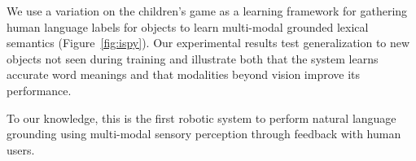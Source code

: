 We use a variation on the children's game \ispy as a learning framework for gathering human language labels for objects to learn multi-modal grounded lexical semantics (Figure~\ref{fig:ispy}).
Our experimental results test generalization to new objects not seen during training and illustrate both that the system learns accurate word meanings and that modalities beyond vision improve its performance.

To our knowledge, this is the first robotic system to perform natural language grounding using multi-modal sensory perception through feedback with human users.